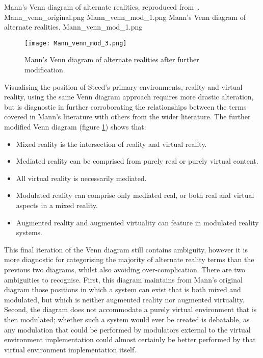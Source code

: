  {Mann's Venn diagram of alternate realities, reproduced from~\cite{Mann2002a}.} {Mann_venn_original.png}
       {Mann_venn_mod_1.png} {Mann's Venn diagram of alternate realities.} {Mann_venn_mod_1.png}

\begin{figure}[h]
\centering
  \texttt{[image: Mann\_venn\_mod\_3.png]}
  \caption{Mann's Venn diagram of alternate realities after further modification.}
  \label{Mann_venn_mod_3.png}
\end{figure}

Visualising the position of Steed's primary environments, reality and virtual reality, using the same Venn diagram approach requires more drastic alteration, but is diagnostic in further corroborating the relationships between the terms covered in Mann's literature with others from the wider literature. The further modified Venn diagram (figure \ref{Mann_venn_mod_3.png}) shows that:
\begin{itemize}
	\item Mixed reality is the intersection of reality and virtual reality.
	\item Mediated reality can be comprised from purely real or purely virtual content.
	\item All virtual reality is necessarily mediated.
	\item Modulated reality can comprise only mediated real, or both real and virtual aspects in a mixed reality.
	\item Augmented reality and augmented virtuality can feature in modulated reality systems.
\end{itemize}

This final iteration of the Venn diagram still contains ambiguity, however it is more diagnostic for categorising the majority of alternate reality terms than the previous two diagrams, whilst also avoiding over-complication. There are two ambiguities to recognise. First, this diagram maintains from Mann's original diagram those positions in which a system can exist that is both mixed and modulated, but which is neither augmented reality nor augmented virtuality. Second, the diagram does not accommodate a purely virtual environment that is then modulated; whether such a system would ever be created is debatable, as any modulation that could be performed by modulators external to the virtual environment implementation could almost certainly be better performed by that virtual environment implementation itself.

